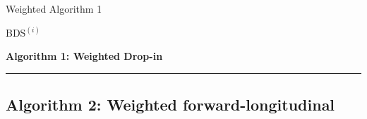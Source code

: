 \begin{frame}[fragile]{Weighted Algorithm 1}

\begin{block}{BDS$^{(i)}$}
\begin{algorithm}
{\bf Algorithm 1: Weighted Drop-in}
\hrule
\label{alg1}
\begin{algorithmic}
\Else
\EndIf
\end{algorithmic}
\end{algorithm}
\end{block}
\end{frame}

%

\subsection{Algorithm 2: Weighted forward-longitudinal}


